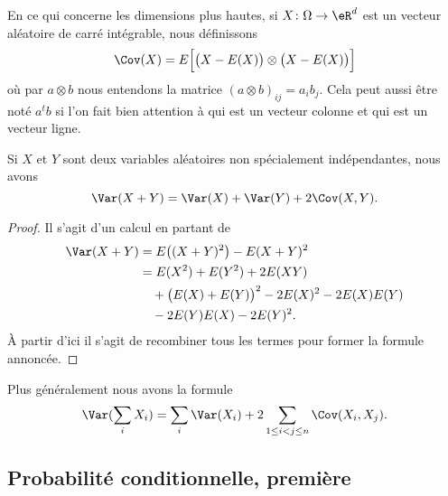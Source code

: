 En ce qui concerne les dimensions plus hautes, si \( X\colon \Omega\to \eR^d\) est un vecteur aléatoire de carré intégrable, nous définissons
\begin{equation}    \label{EqZlvLWx}
    \Cov(X)=E\Big[ \big(  X-E(X) \big)\otimes\big( X-E(X)\big) \Big]
\end{equation}
où par \( a\otimes b\) nous entendons la matrice \( (a\otimes b)_{ij}=a_ib_j\). Cela peut aussi être noté \( a^tb\) si l'on fait bien attention à qui est un vecteur colonne et qui est un vecteur ligne.

\begin{proposition}     \label{PropoVarXpYCov}
    Si \( X\) et \( Y\) sont deux variables aléatoires non spécialement indépendantes, nous avons
    \begin{equation}
        \Var(X+Y)=\Var(X)+\Var(Y)+2\Cov(X,Y).
    \end{equation}
\end{proposition}

\begin{proof}
    Il s'agit d'un calcul en partant de
    \begin{equation}
        \begin{aligned}[]
            \Var(X+Y)&=E\big( (X+Y)^2 \big)-E(X+Y)^2\\
            &=E(X^2)+E(Y^2)+2E(XY)\\
            &\quad+\big( E(X)+E(Y) \big)^2-2E(X)^2-2E(X)E(Y)\\
            &\quad-2 E(Y)E(X)-2E(Y)^2.
        \end{aligned}
    \end{equation}
    À partir d'ici il s'agit de recombiner tous les termes pour former la formule annoncée.
\end{proof}

Plus généralement nous avons la formule
\begin{equation}
    \Var(\sum_i X_i)=\sum_i\Var(X_i)+2\sum_{1\leq i< j\leq n}\Cov(X_i,X_j).
\end{equation}

\subsection{Probabilité conditionnelle, première}

